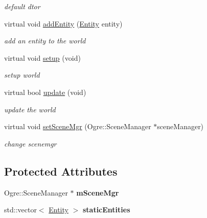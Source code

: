 \begin{DoxyCompactItemize}
\begin{DoxyCompactList}\small\item\em default dtor \end{DoxyCompactList}\item 
virtual void \hyperlink{class_whitedrop_1_1_world_a27d989ee83186c9300e88456b01b5769}{add\+Entity} (\hyperlink{class_whitedrop_1_1_entity}{Entity} entity)
\begin{DoxyCompactList}\small\item\em add an entity to the world \end{DoxyCompactList}\item 
virtual void \hyperlink{class_whitedrop_1_1_world_acea4a0564cf3155cd00036cc1544d228}{setup} (void)
\begin{DoxyCompactList}\small\item\em setup world \end{DoxyCompactList}\item 
virtual bool \hyperlink{class_whitedrop_1_1_world_aa1ad1877f62b000fa678f993440ff3fc}{update} (void)
\begin{DoxyCompactList}\small\item\em update the world \end{DoxyCompactList}\item 
virtual void \hyperlink{class_whitedrop_1_1_world_a019e4754e71072b81ee123f28683c8ae}{set\+Scene\+Mgr} (Ogre\+::\+Scene\+Manager $\ast$scene\+Manager)
\begin{DoxyCompactList}\small\item\em change scenemgr \end{DoxyCompactList}\end{DoxyCompactItemize}
\subsection*{Protected Attributes}
\begin{DoxyCompactItemize}
\item 
\hypertarget{class_whitedrop_1_1_world_ae50111576e92eaf266b91c409bc5647d}{Ogre\+::\+Scene\+Manager $\ast$ {\bfseries m\+Scene\+Mgr}}\label{class_whitedrop_1_1_world_ae50111576e92eaf266b91c409bc5647d}

\item 
\hypertarget{class_whitedrop_1_1_world_a30b8894f6d09cd07795d943aa80cf149}{std\+::vector$<$ \hyperlink{class_whitedrop_1_1_entity}{Entity} $>$ {\bfseries static\+Entities}}\label{class_whitedrop_1_1_world_a30b8894f6d09cd07795d943aa80cf149}

\end{DoxyCompactItemize}


